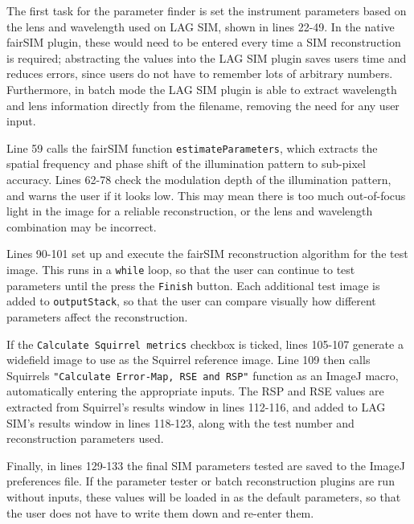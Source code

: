 The first task for the parameter finder is set the instrument parameters based on the lens and wavelength used on LAG SIM, shown in lines 22-49. 
In the native fairSIM plugin, these would need to be entered every time a SIM reconstruction is required; abstracting the values into the LAG SIM plugin saves users time and reduces errors, since users do not have to remember lots of arbitrary numbers. 
Furthermore, in batch mode the LAG SIM plugin is able to extract wavelength and lens information directly from the filename, removing the need for any user input. 

Line 59 calls the fairSIM function \texttt{estimateParameters}, which extracts the spatial frequency and phase shift of the illumination pattern to sub-pixel accuracy. 
Lines 62-78 check the modulation depth of the illumination pattern, and warns the user if it looks low.
This may mean there is too much out-of-focus light in the image for a reliable reconstruction, or the lens and wavelength combination may be incorrect. 

Lines 90-101 set up and execute the fairSIM reconstruction algorithm for the test image.
This runs in a \texttt{while} loop, so that the user can continue to test parameters until the press the \texttt{Finish} button. 
Each additional test image is added to \texttt{outputStack}, so that the user can compare visually how different parameters affect the reconstruction. 

If the \texttt{Calculate Squirrel metrics} checkbox is ticked, lines 105-107 generate a widefield image to use as the Squirrel reference image. 
Line 109 then calls Squirrels \texttt{"Calculate Error-Map, RSE and RSP"} function as an ImageJ macro, automatically entering the appropriate inputs. 
The RSP and RSE values are extracted from Squirrel's results window in lines 112-116, and added to LAG SIM's results window in lines 118-123, along with the test number and reconstruction parameters used. 

Finally, in lines 129-133 the final SIM parameters tested are saved to the ImageJ preferences file. 
If the parameter tester or batch reconstruction plugins are run without inputs, these values will be loaded in as the default parameters, so that the user does not have to write them down and re-enter them. 

